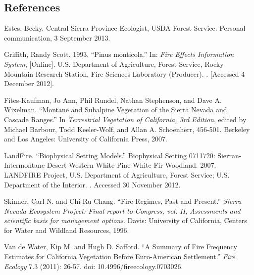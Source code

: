 \clearpage

\subsection*{References}

\begin{hangparas}{.25in}{1} 
Estes, Becky. Central Sierra Province Ecologist, USDA Forest Service. Personal communication, 3 September 2013.

Griffith, Randy Scott. 1993. ``Pinus monticola.'' In: \emph{Fire Effects Information System}, [Online].  U.S. Department of Agriculture, Forest Service,  Rocky Mountain Research Station, Fire Sciences Laboratory (Producer).  . [Accessed 4 December 2012].

Fites-Kaufman, Jo Ann, Phil Rundel, Nathan Stephenson, and Dave A. Wixelman. ``Montane and Subalpine Vegetation of the Sierra Nevada and Cascade Ranges.'' In \emph{Terrestrial Vegetation of California, 3rd Edition}, edited by Michael Barbour, Todd Keeler-Wolf, and Allan A. Schoenherr, 456-501. Berkeley and Los Angeles: University of California Press, 2007. 

LandFire. ``Biophysical Setting Models.'' Biophysical Setting 0711720: Sierran-Intermontane Desert Western White Pine-White Fir Woodland. 2007. LANDFIRE Project, U.S. Department of Agriculture, Forest Service; U.S. Department of the Interior. . Accessed 30 November 2012.

Skinner, Carl N. and Chi-Ru Chang. ``Fire Regimes, Past and Present.'' \emph{Sierra Nevada Ecosystem Project: Final report to Congress, vol. II, Assessments and scientific basis for management options}. Davis: University of California, Centers for Water and Wildland Resources, 1996.

Van de Water, Kip M. and Hugh D. Safford. ``A Summary of Fire Frequency Estimates for California Vegetation Before Euro-American Settlement.'' \emph{Fire Ecology} 7.3 (2011): 26-57. doi: 10.4996/fireecology.0703026.

\end{hangparas}

